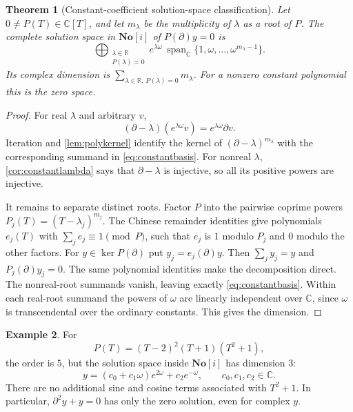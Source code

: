 \documentclass[11pt,a4paper]{article}
\newtheorem{theorem}{Theorem}[section]
\theoremstyle{definition}
\newtheorem{example}[theorem]{Example}
\newcommand{\SC}{\mathbf{No}[i]}
\newcommand{\R}{\mathbb R}
\newcommand{\C}{\mathbb C}
\newcommand{\D}{\partial}
\newcommand{\Span}{\operatorname{span}}
\DeclareMathOperator{\Ker}{ker}
\numberwithin{equation}{section}
\begin{document}
\begin{theorem}[Constant-coefficient solution-space classification]
\label{thm:constantpolynomial}
Let $0\ne P(T)\in\C[T]$, and let $m_\lambda$ be the multiplicity of
$\lambda$ as a root of $P$. The complete solution space in $\SC$ of
$P(\D)y=0$ is
\begin{equation}\label{eq:constantbasis}
 \bigoplus_{\substack{\lambda\in\R\\P(\lambda)=0}}
 e^{\lambda\omega}\,
 \Span_\C\{1,\omega,\ldots,\omega^{m_\lambda-1}\}.
\end{equation}
Its complex dimension is
$\sum_{\lambda\in\R,\,P(\lambda)=0}m_\lambda$.
For a nonzero constant polynomial this is the zero space.
\end{theorem}
\begin{proof}
For real $\lambda$ and arbitrary $v$,
\[
 (\D-\lambda)(e^{\lambda\omega}v)=e^{\lambda\omega}\D v.
\]
Iteration and \cref{lem:polykernel} identify the kernel of
$(\D-\lambda)^{m_\lambda}$ with the corresponding summand in
\eqref{eq:constantbasis}. For nonreal $\lambda$,
\cref{cor:constantlambda} says that $\D-\lambda$ is injective, so all
its positive powers are injective.

It remains to separate distinct roots. Factor $P$ into the pairwise
coprime powers $P_j(T)=(T-\lambda_j)^{m_j}$. The Chinese remainder
identities give polynomials $e_j(T)$ with
$\sum_j e_j\equiv1\pmod P$, such that $e_j$ is $1$ modulo $P_j$ and
$0$ modulo the other factors. For $y\in\Ker P(\D)$ put
$y_j=e_j(\D)y$. Then $\sum_jy_j=y$ and $P_j(\D)y_j=0$.
The same polynomial identities make the decomposition direct. The
nonreal-root summands vanish, leaving exactly \eqref{eq:constantbasis}.
Within each real-root summand the powers of $\omega$ are linearly
independent over $\C$, since $\omega$ is transcendental over the
ordinary constants. This gives the dimension.
\end{proof}

\begin{example}
For
\[
 P(T)=(T-2)^2(T+1)(T^2+1),
\]
the order is $5$, but the solution space inside $\SC$ has dimension $3$:
\[
 y=(c_0+c_1\omega)e^{2\omega}+c_2e^{-\omega},
 \qquad c_0,c_1,c_2\in\C.
\]
There are no additional sine and cosine terms associated with $T^2+1$.
In particular, $\D^2y+y=0$ has only the zero solution, even for complex
$y$.
\end{example}
\end{document}
